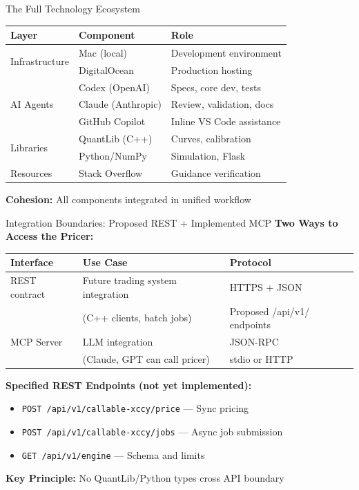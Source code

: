 \documentclass[aspectratio=169,11pt]{beamer}
\begin{document}
\begin{frame}{The Full Technology Ecosystem}
\begin{table}
\centering
\small
\begin{tabular}{lll}
\toprule
\textbf{Layer} & \textbf{Component} & \textbf{Role} \\
\midrule
\multirow{2}{*}{Infrastructure} & Mac (local) & Development environment \\
 & DigitalOcean & Production hosting \\
\midrule
\multirow{3}{*}{AI Agents} & Codex (OpenAI) & Specs, core dev, tests \\
 & Claude (Anthropic) & Review, validation, docs \\
 & GitHub Copilot & Inline VS Code assistance \\
\midrule
\multirow{2}{*}{Libraries} & QuantLib (C++) & Curves, calibration \\
 & Python/NumPy & Simulation, Flask \\
\midrule
Resources & Stack Overflow & Guidance verification \\
\bottomrule
\end{tabular}
\end{table}

\textbf{Cohesion:} All components integrated in unified workflow
\end{frame}

\begin{frame}{Integration Boundaries: Proposed REST + Implemented MCP}
\textbf{Two Ways to Access the Pricer:}

\begin{table}
\centering
\small
\begin{tabular}{lll}
\toprule
\textbf{Interface} & \textbf{Use Case} & \textbf{Protocol} \\
\midrule
REST contract & Future trading system integration & HTTPS + JSON \\
 & (C++ clients, batch jobs) & Proposed /api/v1/ endpoints \\
\midrule
MCP Server & LLM integration & JSON-RPC \\
 & (Claude, GPT can call pricer) & stdio or HTTP \\
\bottomrule
\end{tabular}
\end{table}

\textbf{Specified REST Endpoints (not yet implemented):}
\begin{itemize}
    \item \texttt{POST /api/v1/callable-xccy/price} --- Sync pricing
    \item \texttt{POST /api/v1/callable-xccy/jobs} --- Async job submission
    \item \texttt{GET /api/v1/engine} --- Schema and limits
\end{itemize}

\textbf{Key Principle:} No QuantLib/Python types cross API boundary
\end{frame}
\end{document}
